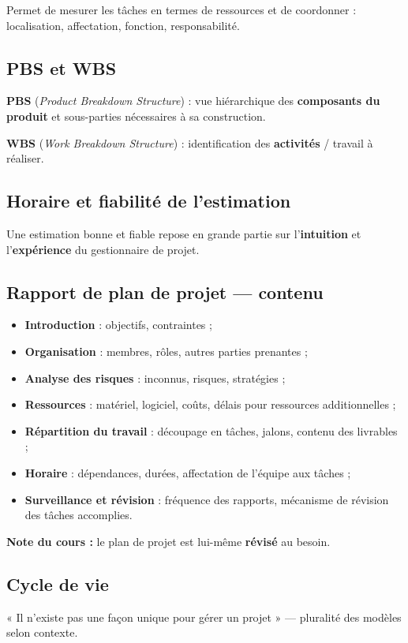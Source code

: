 \documentclass[11pt,a4paper]{article}
\begin{document}
Permet de mesurer les tâches en termes de ressources et de coordonner : localisation, affectation, fonction, responsabilité.

\subsection{PBS et WBS}
\textbf{PBS} (\emph{Product Breakdown Structure}) : vue hiérarchique des \textbf{composants du produit} et sous-parties nécessaires à sa construction.

\textbf{WBS} (\emph{Work Breakdown Structure}) : identification des \textbf{activités} / travail à réaliser.

\subsection{Horaire et fiabilité de l'estimation}
Une estimation bonne et fiable repose en grande partie sur l'\textbf{intuition} et l'\textbf{expérience} du gestionnaire de projet.

\subsection{Rapport de plan de projet — contenu}
\begin{itemize}[nosep]
  \item \textbf{Introduction} : objectifs, contraintes ;
  \item \textbf{Organisation} : membres, rôles, autres parties prenantes ;
  \item \textbf{Analyse des risques} : inconnus, risques, stratégies ;
  \item \textbf{Ressources} : matériel, logiciel, coûts, délais pour ressources additionnelles ;
  \item \textbf{Répartition du travail} : découpage en tâches, jalons, contenu des livrables ;
  \item \textbf{Horaire} : dépendances, durées, affectation de l'équipe aux tâches ;
  \item \textbf{Surveillance et révision} : fréquence des rapports, mécanisme de révision des tâches accomplies.
\end{itemize}
\textbf{Note du cours :} le plan de projet est lui-même \textbf{révisé} au besoin.

\subsection{Cycle de vie}
« Il n'existe pas une façon unique pour gérer un projet » — pluralité des modèles selon contexte.
\end{document}
